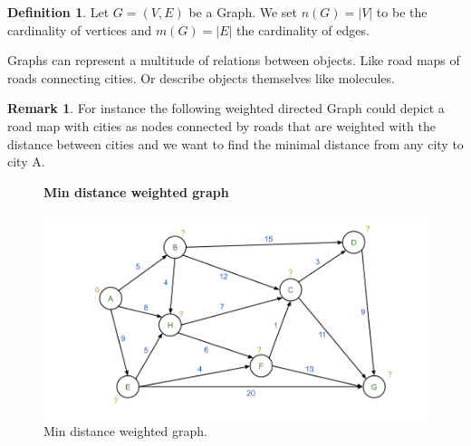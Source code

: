 \documentclass{article}
\theoremstyle{definition}
\newtheorem{definition}[theorem]{Definition}
\newtheorem{remark}[theorem]{Remark}
\newcommand*{\figuretitle}[1]{%
    {\centering%
    \textbf{#1}%
    \par\medskip}%
}
\begin{document}
\begin{definition}
Let $G = (V, E)$ be a Graph. We set $n(G) = |V|$ to be the cardinality of vertices and $m(G) = |E|$ the cardinality of edges.
\end{definition}

Graphs can represent a multitude of relations between objects. Like road maps of roads connecting cities. Or describe objects themselves like molecules.

\begin{remark}
For instance the following weighted directed Graph could depict a road map with cities as nodes connected by roads that are weighted with the distance between cities and we want to find the minimal distance from any city to city A. \

\begin{figure}[H]
\centering
\figuretitle{Min distance weighted graph}
\includegraphics[scale=0.5]{graphics/weighted_directed_graph_2.png}
\caption{Min distance weighted graph.}
\label{fig:neuron}
\end{figure}


\end{remark}
\end{document}

